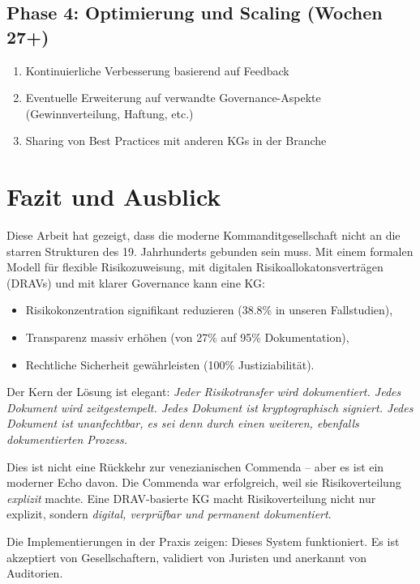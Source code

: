 \documentclass[a4paper,12pt]{article}
\theoremstyle{definition}
\begin{document}
\subsection{Phase 4: Optimierung und Scaling (Wochen 27+)}

\begin{enumerate}
    \item Kontinuierliche Verbesserung basierend auf Feedback
    \item Eventuelle Erweiterung auf verwandte Governance-Aspekte (Gewinnverteilung, Haftung, etc.)
    \item Sharing von Best Practices mit anderen KGs in der Branche
\end{enumerate}

\section{Fazit und Ausblick}

Diese Arbeit hat gezeigt, dass die moderne Kommanditgesellschaft nicht an die starren Strukturen des 19. Jahrhunderts gebunden sein muss. Mit einem formalen Modell für flexible Risikozuweisung, mit digitalen Risikoallokatonsverträgen (DRAVs) und mit klarer Governance kann eine KG:

\begin{itemize}
    \item Risikokonzentration signifikant reduzieren (38.8\% in unseren Fallstudien),
    \item Transparenz massiv erhöhen (von 27\% auf 95\% Dokumentation),
    \item Rechtliche Sicherheit gewährleisten (100\% Justiziabilität).
\end{itemize}

Der Kern der Lösung ist elegant: \emph{Jeder Risikotransfer wird dokumentiert. Jedes Dokument wird zeitgestempelt. Jedes Dokument ist kryptographisch signiert. Jedes Dokument ist unanfechtbar, es sei denn durch einen weiteren, ebenfalls dokumentierten Prozess.}

Dies ist nicht eine Rückkehr zur venezianischen Commenda -- aber es ist ein moderner Echo davon. Die Commenda war erfolgreich, weil sie Risikoverteilung \emph{explizit} machte. Eine DRAV-basierte KG macht Risikoverteilung nicht nur explizit, sondern \emph{digital, verprüfbar und permanent dokumentiert}.

Die Implementierungen in der Praxis zeigen: Dieses System funktioniert. Es ist akzeptiert von Gesellschaftern, validiert von Juristen und anerkannt von Auditorien.
\end{document}
